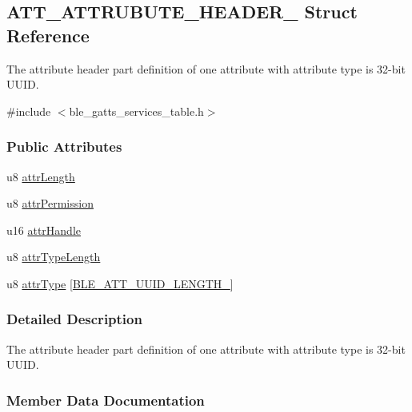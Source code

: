 \hypertarget{struct_a_t_t___a_t_t_r_u_b_u_t_e___h_e_a_d_e_r__4}{}\subsection{A\+T\+T\+\_\+\+A\+T\+T\+R\+U\+B\+U\+T\+E\+\_\+\+H\+E\+A\+D\+E\+R\+\_ Struct Reference}
\label{struct_a_t_t___a_t_t_r_u_b_u_t_e___h_e_a_d_e_r__4}


The attribute header part definition of one attribute with attribute type is 32-\/bit U\+U\+ID.  




{\ttfamily \#include $<$ble\+\_\+gatts\+\_\+services\+\_\+table.\+h$>$}

\subsubsection*{Public Attributes}
\begin{DoxyCompactItemize}
\item 
u8 \hyperlink{struct_a_t_t___a_t_t_r_u_b_u_t_e___h_e_a_d_e_r__4_a76b9d1bc3723a0721d98745950e23154}{attr\+Length}
\item 
u8 \hyperlink{struct_a_t_t___a_t_t_r_u_b_u_t_e___h_e_a_d_e_r__4_a19ca3e8478d21d66e722f67d44ae36df}{attr\+Permission}
\item 
u16 \hyperlink{struct_a_t_t___a_t_t_r_u_b_u_t_e___h_e_a_d_e_r__4_a53afb9275a1b2e34fa6b5125945da4b4}{attr\+Handle}
\item 
u8 \hyperlink{struct_a_t_t___a_t_t_r_u_b_u_t_e___h_e_a_d_e_r__4_aa422c1951e207206cf6fc515b1059ba9}{attr\+Type\+Length}
\item 
u8 \hyperlink{struct_a_t_t___a_t_t_r_u_b_u_t_e___h_e_a_d_e_r__4_a890e74c9f158d26805415c7e192c9f7d}{attr\+Type} \mbox{[}\hyperlink{group___b_l_e___a_t_t___u_u_i_d___l_e_n_g_t_h___t_y_p_e_s_ga8a4a9607502c5a3b472f54edfc6cee71}{B\+L\+E\+\_\+\+A\+T\+T\+\_\+\+U\+U\+I\+D\+\_\+\+L\+E\+N\+G\+T\+H\+\_}\mbox{]}
\end{DoxyCompactItemize}


\subsubsection{Detailed Description}
The attribute header part definition of one attribute with attribute type is 32-\/bit U\+U\+ID. 

\subsubsection{Member Data Documentation}
